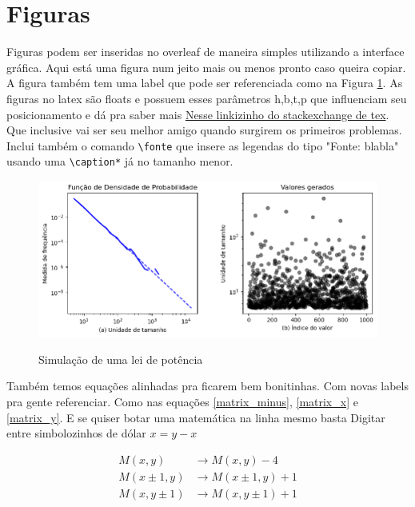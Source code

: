 \section{Figuras}

Figuras podem ser inseridas no overleaf de maneira simples utilizando a interface gráfica. Aqui está uma figura num jeito mais ou menos pronto caso queira copiar. A figura também tem uma label que pode ser referenciada como na Figura \ref{fig:lei_potencias}. As figuras no latex são floats e possuem esses parâmetros h,b,t,p que influenciam seu posicionamento e dá pra saber mais \href{https://tex.stackexchange.com/questions/39017/how-to-influence-the-position-of-float-environments-like-figure-and-table-in-lat}{Nesse linkizinho do stackexchange de tex}. Que inclusive vai ser seu melhor amigo quando surgirem os primeiros problemas. Inclui também o comando \verb!\fonte! que insere as legendas do tipo "Fonte: blabla" usando uma \verb!\caption*! já no tamanho menor.

\begin{figure}[h]
    \centering
    \caption{Simulação de uma lei de potência}
    \includegraphics[width=1\linewidth]{Imagens/duas.png}
    \label{fig:lei_potencias}
\end{figure}


Também temos equações alinhadas pra ficarem bem bonitinhas. Com novas labels pra gente referenciar. Como nas equações \eqref{matrix_minus}, \eqref{matrix_x} e \eqref{matrix_y}. E se quiser botar uma matemática na linha mesmo basta Digitar entre simbolozinhos de dólar $x=y-x$

\begin{align} 
M(x,y) & \rightarrow  M(x,y) - 4 \label{matrix_minus}\\ 
M(x\pm 1,y) &\rightarrow  M(x\pm 1,y) + 1 \label{matrix_x}\\
M(x,y \pm 1) &\rightarrow  M(x, y\pm 1) + 1 \label{matrix_y}
\end{align}

